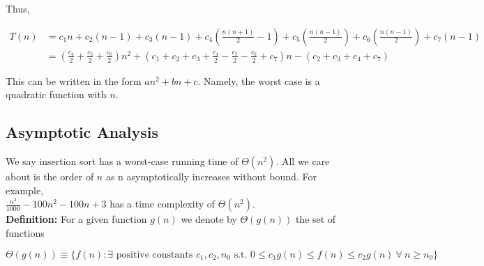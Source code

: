 \documentclass[]{article}
\begin{document}
Thus, 

\begin{align*}
	T(n) &= c_1n+c_2(n-1)+c_3(n-1) + c_4\left(\frac{n(n+1)}{2} - 1\right) + c_5\left(\frac{n(n-1)}{2}\right) + c_6\left(\frac{n(n-1)}{2}\right) + c_7(n-1)\\
	&= (\frac{c_4}{2} + \frac{c_5}{2} + \frac{c_6}{2})n^2 + (c_1 + c_2 + c_3 + \frac{c_4}{2} - \frac{c_5}{2} - \frac{c_6}{2} + c_7)n - (c_2 + c_3 + c_4 + c_7)
\end{align*}

This can be written in the form $an^2 + bn + c$. Namely, the worst case is a quadratic function with $n$.\\

\subsection{Asymptotic Analysis}\bigbreak

We say insertion sort has a worst-case running time of $\Theta(n^2)$. All we care about is the order of $n$ as n asymptotically increases without bound. For example, \\

$\frac{n^3}{1000} - 100n^2 - 100n + 3$ has a time complexity of $\Theta(n^2)$.\\

\textbf{Definition:} For a given function $g(n)$ we denote by $\Theta(g(n))$ the set of functions
 
\begin{equation*}
	\Theta(g(n)) \equiv \{f(n): \exists \text{ positive constants } c_1, c_2, n_0 \text{ s.t. } 0 \leq c_1 g(n) \leq f(n) \leq c_2 g(n)~\forall~n \geq n_0\}
\end{equation*}\bigbreak\bigbreak

\end{document}
